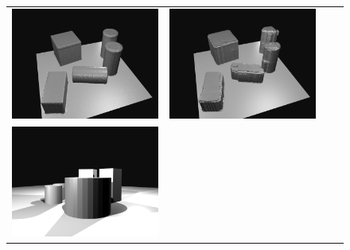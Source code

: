 \begin{figure}
\begin{tabular}{cccc}
\includegraphics[height=\turnheight]{xf2hcoes8lp9fb1t_SEQ_gt.png} &
\includegraphics[height=\turnheight]{xf2hcoes8lp9fb1t_SEQ_pred_voxlets.png} \\
\includegraphics[height=\turnheight]{kmrkmma8u2456lgk_SEQ_input.png} &

\end{tabular}
\end{figure}
